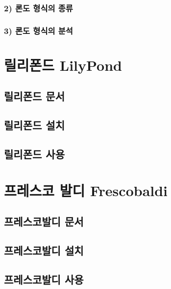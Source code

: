 \documentclass[12pt, a4paper, oneside]{book}
\let\stdsection\section
\renewcommand\section{\newpage\stdsection}
\begin{document}
	\subsection{2) 론도 형식의 종류}

	\subsection{3) 론도 형식의 분석}




	\chapter{릴리폰드 LilyPond}
	\noptcrule
	\parttoc				

	\section{릴리폰드 문서}

	\section{릴리폰드 설치}


	\section{릴리폰드 사용}




	\chapter{프레스코 발디  Frescobaldi}
	\noptcrule
	\parttoc				

	\section{프레스코발디 문서}

	\section{프레스코발디 설치}


	\section{프레스코발디 사용}
\end{document}
